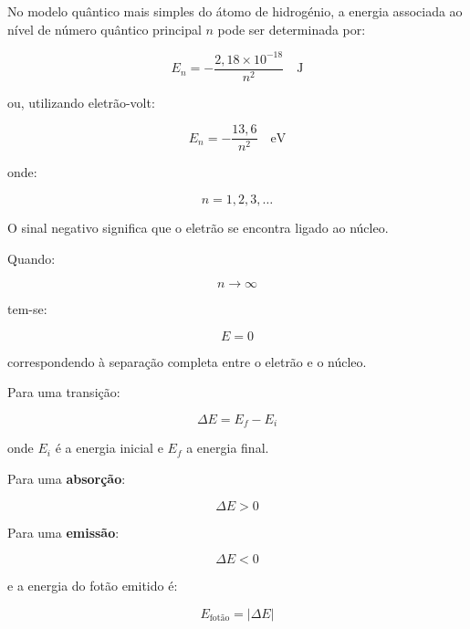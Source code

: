 \documentclass[11pt,a4paper]{article}
\begin{document}
	\begin{recorda}
		
		No modelo quântico mais simples do átomo de hidrogénio, a energia
		associada ao nível de número quântico principal \(n\) pode ser determinada
		por:
		
		\[
		\boxed{
			E_n=
			-\frac{2,18\times10^{-18}}{n^2}
			\quad \mathrm{J}
		}
		\]
		
		ou, utilizando eletrão-volt:
		
		\[
		\boxed{
			E_n=
			-\frac{13,6}{n^2}
			\quad \mathrm{eV}
		}
		\]
		
		onde:
		
		\[
		n=1,2,3,\ldots
		\]
		
		O sinal negativo significa que o eletrão se encontra ligado ao núcleo.
		
		Quando:
		
		\[
		n\rightarrow\infty
		\]
		
		tem-se:
		
		\[
		E=0
		\]
		
		correspondendo à separação completa entre o eletrão e o núcleo.
		
		Para uma transição:
		
		\[
		\boxed{
			\Delta E=E_f-E_i
		}
		\]
		
		onde \(E_i\) é a energia inicial e \(E_f\) a energia final.
		
		Para uma \textbf{absorção}:
		
		\[
		\Delta E>0
		\]
		
		Para uma \textbf{emissão}:
		
		\[
		\Delta E<0
		\]
		
		e a energia do fotão emitido é:
		
		\[
		\boxed{
			E_{\text{fotão}}=
			|\Delta E|
		}
		\]
		
	\end{recorda}
	
	
\end{document}
